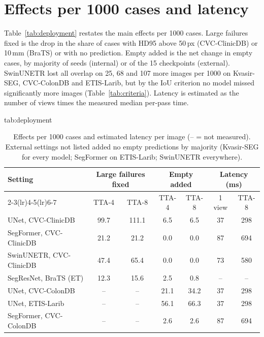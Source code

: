 \section{Effects per 1000 cases and latency}
\label{app:deployment}
Table~\ref{tab:deployment} restates the main effects per 1000 cases. Large failures fixed is the drop in the share of cases with HD95 above 50\,px (CVC-ClinicDB) or 10\,mm (BraTS) or with no prediction. Empty added is the net change in empty cases, by majority of seeds (internal) or of the 15 checkpoints (external). SwinUNETR lost all overlap on 25, 68 and 107 more images per 1000 on Kvasir-SEG, CVC-ColonDB and ETIS-Larib, but by the IoU criterion no model missed significantly more images (Table~\ref{tab:criteria}). Latency is estimated as the number of views times the measured median per-pass time.

\begin{table}[htbp]
\floatconts
  {tab:deployment}%
  {\caption{Effects per 1000 cases and estimated latency per image (-- = not measured). External settings not listed added no empty predictions by majority (Kvasir-SEG for every model; SegFormer on ETIS-Larib; SwinUNETR everywhere).}}%
  {
  \begin{tabular}{lcccccc}
  \toprule
  Setting & \multicolumn{2}{c}{Large failures fixed} & \multicolumn{2}{c}{Empty added} & \multicolumn{2}{c}{Latency (ms)} \\
  \cmidrule(lr){2-3}\cmidrule(lr){4-5}\cmidrule(lr){6-7}
   & TTA-4 & TTA-8 & TTA-4 & TTA-8 & 1 view & TTA-8 \\
  \midrule
  UNet, CVC-ClinicDB        & 99.7 & 111.1 & 6.5 & 6.5 & 37 & 298 \\
  SegFormer, CVC-ClinicDB   & 21.2 & 21.2  & 0.0 & 0.0 & 87 & 694 \\
  SwinUNETR, CVC-ClinicDB   & 47.4 & 65.4  & 0.0 & 0.0 & 73 & 580 \\
  SegResNet, BraTS (ET)     & 12.3 & 15.6  & 2.5 & 0.8 & -- & -- \\
  UNet, CVC-ColonDB         & --   & --    & 21.1 & 34.2 & 37 & 298 \\
  UNet, ETIS-Larib          & --   & --    & 56.1 & 66.3 & 37 & 298 \\
  SegFormer, CVC-ColonDB    & --   & --    & 2.6 & 2.6 & 87 & 694 \\
  \bottomrule
  \end{tabular}}
\end{table}

